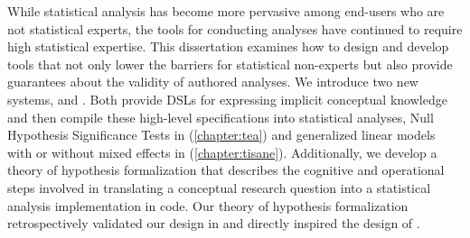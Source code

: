 
While statistical analysis has become more pervasive among end-users who are not
statistical experts, the tools for conducting analyses have continued to require
high statistical expertise. This dissertation examines how to design and develop
tools that not only lower the barriers for statistical non-experts but also
provide guarantees about the validity of authored analyses. We introduce two new
systems, \tea and \tisane. Both provide DSLs for expressing implicit conceptual
knowledge and then compile these high-level specifications into statistical
analyses, Null Hypothesis Significance Tests in \tea (\autoref{chapter:tea}) and
generalized linear models with or without mixed effects in \tisane
(\autoref{chapter:tisane}). 
Additionally, we develop a theory of hypothesis formalization that describes the
cognitive and operational steps involved in translating a conceptual research
question into a statistical analysis implementation in code. Our theory of
hypothesis formalization retrospectively validated our design in \tea and
directly inspired the design of \tisane. 

